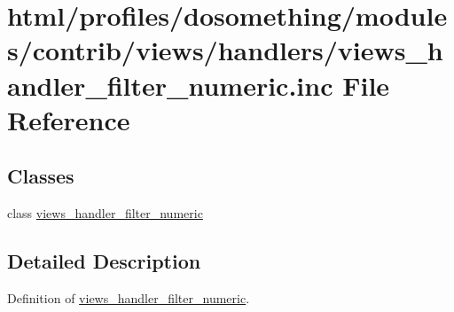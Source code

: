 \hypertarget{views__handler__filter__numeric_8inc}{
\section{html/profiles/dosomething/modules/contrib/views/handlers/views\_\-handler\_\-filter\_\-numeric.inc File Reference}
\label{views__handler__filter__numeric_8inc}
}
\subsection*{Classes}
\begin{DoxyCompactItemize}
\item 
class \hyperlink{classviews__handler__filter__numeric}{views\_\-handler\_\-filter\_\-numeric}
\end{DoxyCompactItemize}


\subsection{Detailed Description}
Definition of \hyperlink{classviews__handler__filter__numeric}{views\_\-handler\_\-filter\_\-numeric}. 